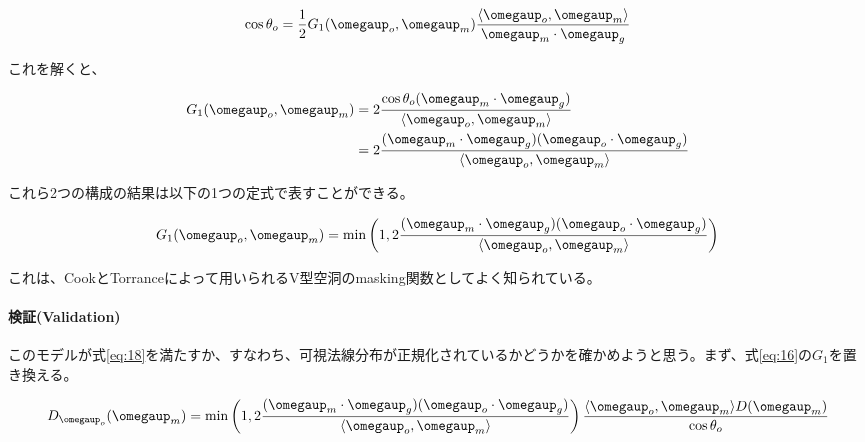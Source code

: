 \documentclass[a4j,xelatex,ja=standard]{bxjsarticle}
\begin{document}
\begin{equation}
    \cos\theta_o = \frac{1}{2}G_1(\boldsymbol{\omegaup}_o, \boldsymbol{\omegaup}_m) \frac{\langle \boldsymbol{\omegaup}_o, \boldsymbol{\omegaup}_m \rangle}{\boldsymbol{\omegaup}_m \cdot \boldsymbol{\omegaup}_g}
    \label{eq:47}
\end{equation}

これを解くと、

\begin{equation}
    \begin{split}
        G_1(\boldsymbol{\omegaup}_o, \boldsymbol{\omegaup}_m)
        &= 2 \frac{\cos\theta_o (\boldsymbol{\omegaup}_m \cdot \boldsymbol{\omegaup}_g)}{\langle \boldsymbol{\omegaup}_o, \boldsymbol{\omegaup}_m \rangle} \\
        &= 2 \frac{(\boldsymbol{\omegaup}_m \cdot \boldsymbol{\omegaup}_g) (\boldsymbol{\omegaup}_o \cdot \boldsymbol{\omegaup}_g)}{\langle \boldsymbol{\omegaup}_o, \boldsymbol{\omegaup}_m \rangle}
    \end{split}
    \label{eq:48}
\end{equation}

これら2つの構成の結果は以下の1つの定式で表すことができる。

\begin{equation}
    G_1(\boldsymbol{\omegaup}_o, \boldsymbol{\omegaup}_m) = \min \left( 1, 2 \frac{(\boldsymbol{\omegaup}_m \cdot \boldsymbol{\omegaup}_g) (\boldsymbol{\omegaup}_o \cdot \boldsymbol{\omegaup}_g)}{\langle \boldsymbol{\omegaup}_o, \boldsymbol{\omegaup}_m \rangle} \right)
    \label{eq:49}
\end{equation}

これは、CookとTorranceによって用いられるV型空洞のmasking関数としてよく知られている。

\paragraph{検証(Validation)}

このモデルが式\eqref{eq:18}を満たすか、すなわち、可視法線分布が正規化されているかどうかを確かめようと思う。まず、式\eqref{eq:16}の$G_1$を置き換える。

\begin{equation}
    D_{\boldsymbol{\omegaup}_o}(\boldsymbol{\omegaup}_m) = \min \left( 1, 2 \frac{(\boldsymbol{\omegaup}_m \cdot \boldsymbol{\omegaup}_g) (\boldsymbol{\omegaup}_o \cdot \boldsymbol{\omegaup}_g)}{\langle \boldsymbol{\omegaup}_o, \boldsymbol{\omegaup}_m \rangle} \right) \frac{\langle \boldsymbol{\omegaup}_o, \boldsymbol{\omegaup}_m \rangle D(\boldsymbol{\omegaup}_m)}{\cos\theta_o}
    \label{eq:50}
\end{equation}
\end{document}
